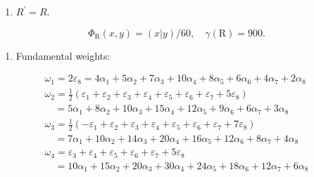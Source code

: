 \begin{enumerate}
\def\labelenumi{(\Alph{enumi})}
\setcounter{enumi}{21}
\tightlist
\item
  \(R^{\prime} = R.\)
\end{enumerate}

\[
  \Phi_ {\mathrm{R}} (x, y) = (x | y) / 60, \quad \gamma (\mathrm{R}) = 900.
\]

\begin{enumerate}
\def\labelenumi{(\Roman{enumi})}
\setcounter{enumi}{5}
\tightlist
\item
  Fundamental weights:
\end{enumerate}

\[
\begin{array}{l} \omega_ {1} = 2 \varepsilon_ {8} = 4 \alpha_ {1} + 5 \alpha_ {2} + 7 \alpha_ {3} + 10 \alpha_ {4} + 8 \alpha_ {5} + 6 \alpha_ {6} + 4 \alpha_ {7} + 2 \alpha_ {8} \\ \omega_ {2} = \frac {1}{2} (\varepsilon_ {1} + \varepsilon_ {2} + \varepsilon_ {3} + \varepsilon_ {4} + \varepsilon_ {5} + \varepsilon_ {6} + \varepsilon_ {7} + 5 \varepsilon_ {8}) \\ \quad = 5 \alpha_ {1} + 8 \alpha_ {2} + 10 \alpha_ {3} + 15 \alpha_ {4} + 12 \alpha_ {5} + 9 \alpha_ {6} + 6 \alpha_ {7} + 3 \alpha_ {8} \\ \omega_ {3} = \frac {1}{2} (- \varepsilon_ {1} + \varepsilon_ {2} + \varepsilon_ {3} + \varepsilon_ {4} + \varepsilon_ {5} + \varepsilon_ {6} + \varepsilon_ {7} + 7 \varepsilon_ {8}) \\ \quad = 7 \alpha_ {1} + 10 \alpha_ {2} + 14 \alpha_ {3} + 20 \alpha_ {4} + 16 \alpha_ {5} + 12 \alpha_ {6} + 8 \alpha_ {7} + 4 \alpha_ {8} \\ \omega_ {4} = \varepsilon_ {3} + \varepsilon_ {4} + \varepsilon_ {5} + \varepsilon_ {6} + \varepsilon_ {7} + 5 \varepsilon_ {8} \\ \quad = 10 \alpha_ {1} + 15 \alpha_ {2} + 20 \alpha_ {3} + 30 \alpha_ {4} + 24 \alpha_ {5} + 18 \alpha_ {6} + 12 \alpha_ {7} + 6 \alpha_ {8} \end{array}
\]

